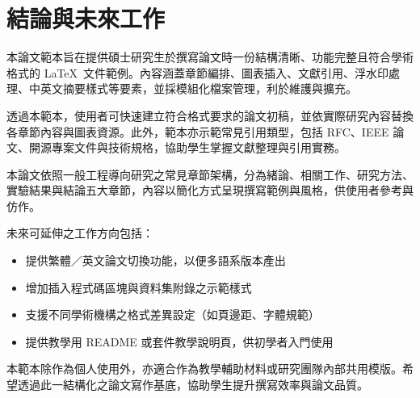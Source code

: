 \chapter{結論與未來工作}

本論文範本旨在提供碩士研究生於撰寫論文時一份結構清晰、功能完整且符合學術格式的 \LaTeX~文件範例。內容涵蓋章節編排、圖表插入、文獻引用、浮水印處理、中英文摘要樣式等要素，並採模組化檔案管理，利於維護與擴充。

透過本範本，使用者可快速建立符合格式要求的論文初稿，並依實際研究內容替換各章節內容與圖表資源。此外，範本亦示範常見引用類型，包括 RFC、IEEE 論文、開源專案文件與技術規格，協助學生掌握文獻整理與引用實務。

本論文依照一般工程導向研究之常見章節架構，分為緒論、相關工作、研究方法、實驗結果與結論五大章節，內容以簡化方式呈現撰寫範例與風格，供使用者參考與仿作。

未來可延伸之工作方向包括：

\begin{itemize}
  \item 提供繁體／英文論文切換功能，以便多語系版本產出
  \item 增加插入程式碼區塊與資料集附錄之示範樣式
  \item 支援不同學術機構之格式差異設定（如頁邊距、字體規範）
  \item 提供教學用 README 或套件教學說明頁，供初學者入門使用
\end{itemize}

本範本除作為個人使用外，亦適合作為教學輔助材料或研究團隊內部共用模版。希望透過此一結構化之論文寫作基底，協助學生提升撰寫效率與論文品質。
